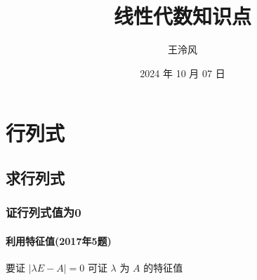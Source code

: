 \documentclass[a4paper,12pt,UTF8]{ctexart}
\begin{document}
    \title{线性代数知识点}
    \author{王泠风}
    \date{2024 年 10 月 07 日}
    \maketitle
    
    \section{行列式}

    \subsection{求行列式}

    \subsubsection{证行列式值为0}

    \paragraph{利用特征值(2017年5题)}
    要证 \(|\lambda E-A|=0\) 可证 \(\lambda \) 为 \(A\) 的特征值
\end{document}
